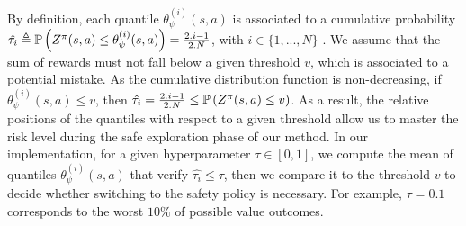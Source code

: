 By definition, each quantile $\theta_{\psi}^{(i)}(s, a)$ is associated to a cumulative probability $\hat{\tau_i} \triangleq \mathbb{P}\left(Z^{\pi}(s, a) \le \theta_{\psi}^{(i)}(s, a)\right) = \frac{2.i - 1}{2.N}$, with $i\in\{1,...,N\}$ \cite{QR-DQN}. We assume that the sum of rewards must not fall below a given threshold $v$, which is associated to a potential mistake. As the cumulative distribution function is non-decreasing, if $\theta_{\psi}^{(i)}(s, a) \le v$, then $\hat{\tau_i} = \frac{2.i - 1}{2.N} \le \mathbb{P}\left(Z^{\pi}(s, a) \le v\right)$. As a result, the relative positions of the quantiles with respect to a given threshold allow us to master the risk level during the safe exploration phase of our method. In our implementation, for a given hyperparameter $\tau \in [0, 1]$, we compute the mean of quantiles $\theta_{\psi}^{(i)}(s, a)$ that verify $\hat{\tau_i} \le \tau$, then we compare it to the threshold $v$ to decide whether switching to the safety policy is necessary. For example, $\tau = 0.1$ corresponds to the worst $10 \%$ of possible value outcomes.





